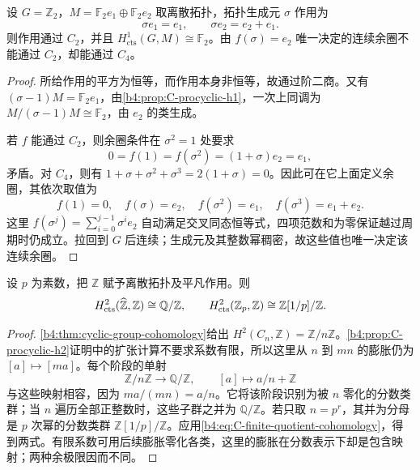 \begin{proposition}\label{b4:prop:C-cocycle-larger-quotient}
	设 \(G=\mathbb Z_2\)，\(M=\mathbb F_2 e_1\oplus\mathbb F_2 e_2\) 取离散拓扑，拓扑生成元 \(\sigma\) 作用为
	\[
		\sigma e_1=e_1,\qquad\sigma e_2=e_2+e_1.
	\]
	则作用通过 \(C_2\)，并且 \(H^1_{\mathrm{cts}}(G,M)\cong\mathbb F_2\)。由 \(f(\sigma)=e_2\) 唯一决定的连续余圈不能通过 \(C_2\)，却能通过 \(C_4\)。
\end{proposition}
\begin{proof}
	所给作用的平方为恒等，而作用本身非恒等，故通过阶二商。又有 \((\sigma-1)M=\mathbb F_2e_1\)，由\cref{b4:prop:C-procyclic-h1}，一次上同调为 \(M/(\sigma-1)M\cong\mathbb F_2\)，由 \(e_2\) 的类生成。

	若 \(f\) 能通过 \(C_2\)，则余圈条件在 \(\sigma^2=1\) 处要求
	\[
		0=f(1)=f(\sigma^2)=(1+\sigma)e_2=e_1,
	\]
	矛盾。对 \(C_4\)，则有 \(1+\sigma+\sigma^2+\sigma^3=2(1+\sigma)=0\)。因此可在它上面定义余圈，其依次取值为
	\[
		f(1)=0,\quad f(\sigma)=e_2,\quad f(\sigma^2)=e_1,\quad f(\sigma^3)=e_1+e_2.
	\]
	这里 \(f(\sigma^j)=\sum_{i=0}^{j-1}\sigma^i e_2\) 自动满足交叉同态恒等式，四项范数和为零保证越过周期时仍成立。拉回到 \(G\) 后连续；生成元及其整数幂稠密，故这些值也唯一决定该连续余圈。
\end{proof}

\begin{proposition}\label{b4:prop:C-integer-procyclic-h2}
	设 \(p\) 为素数，把 \(\mathbb Z\) 赋予离散拓扑及平凡作用。则
	\[
		H^2_{\mathrm{cts}}(\widehat{\vphantom{Z}\mathbb Z},\mathbb Z) \cong\mathbb Q/\mathbb Z,\qquad H^2_{\mathrm{cts}}(\mathbb Z_p,\mathbb Z) \cong\mathbb Z[1/p]/\mathbb Z.
	\]
\end{proposition}
\begin{proof}
	\cref{b4:thm:cyclic-group-cohomology}给出 \(H^2(C_n,\mathbb Z)=\mathbb Z/n\mathbb Z\)。\cref{b4:prop:C-procyclic-h2}证明中的扩张计算不要求系数有限，所以这里从 \(n\) 到 \(mn\) 的膨胀仍为 \([a]\mapsto[ma]\)。每个阶段的单射
	\[
		\mathbb Z/n\mathbb Z\longrightarrow\mathbb Q/\mathbb Z, \qquad[a]\longmapsto a/n+\mathbb Z
	\]
	与这些映射相容，因为 \(ma/(mn)=a/n\)。它将该阶段识别为被 \(n\) 零化的分数类群；当 \(n\) 遍历全部正整数时，这些子群之并为 \(\mathbb Q/\mathbb Z\)。若只取 \(n=p^r\)，其并为分母是 \(p\) 次幂的分数类群 \(\mathbb Z[1/p]/\mathbb Z\)。应用\eqref{b4:eq:C-finite-quotient-cohomology}，得到两式。有限系数可用后续膨胀零化各类，这里的膨胀在分数表示下却是包含映射；两种余极限因而不同。
\end{proof}
